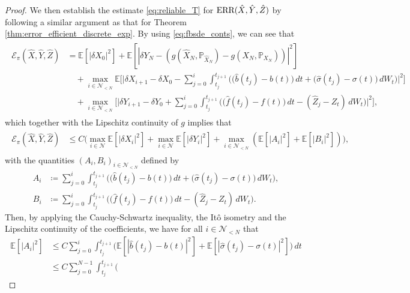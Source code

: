 \documentclass[11pt]{article}
\numberwithin{equation}{section}
\theoremstyle{definition}
\theoremstyle{remark}
\def\l{\label}  \def\f{\frac}  \def\fa{\forall}
\def\cE{\mathcal{E}}
\def\cN{\mathcal{N}}
\def\sE{{\mathbb{E}}}
\def\sP{\mathbb{P}}
\newcommand{\err}{\textnormal{ERR}}
\begin{document}
\begin{proof}
We then establish the estimate \eqref{eq:reliable_T} for $\err(\hat{X},\hat{Y},\hat{Z})$
by following a similar argument as that for Theorem \ref{thm:error_efficient_discrete_exp}.
By using \eqref{eq:fbsde_conts},
we can see that
\begin{align*}%
\begin{split}
\cE_\pi(\hat{X},\hat{Y},\hat{Z})
&=
\sE[|\delta {X}_0|^2]
+
\sE[|\delta {Y}_N-(g(\hat{X}_N,\sP_{\hat{X}_N})-g({X}_N,\sP_{{X}_N}))|^2]
\\
&\quad +
\max_{i\in \cN_{<N}}
\sE
\bigg[
\bigg|
\delta {X}_{i+1}
-\delta {X}_{0}
-\sum_{j=0}^i
\int_{t_j}^{t_{j+1}}
\bigg(
 \big(
\hat{b}(t_{j})-b(t)
 \big)\,dt  +
 \big(
 \hat{\sigma}(t_{j})-\sigma(t)
  \big)\,dW_t
  \bigg)
\bigg|^2
\bigg]\\
&\quad +
\max_{i\in \cN_{<N}}
\bigg[
\bigg|
\delta {Y}_{i+1}-\delta {Y}_0
+\sum_{j=0}^{i}
\int_{t_j}^{t_{j+1}}
\bigg(
\big(
 \hat{f}(t_{j})
 -{f}(t)
 \big)\,dt- 
 (\hat{Z}_j-Z_t)\,dW_t
 \bigg)
\bigg|^2
\bigg],
\end{split}
\end{align*}
which together with the Lipschitz continuity of $g$ implies that
\begin{align}%
\begin{split}
\cE_\pi(\hat{X},\hat{Y},\hat{Z})
&\le
C\bigg(
\max_{i\in \cN}\sE[|\delta {X}_i|^2]
+\max_{i\in \cN}\sE[|\delta {Y}_i|^2]
 +
\max_{i\in \cN_{<N}}
(\sE[ |A_{i}|^2] +\sE[ |B_{i}|^2])
\bigg),
\end{split}
\end{align}
with the quantities $(A_i,B_i)_{i\in \cN_{<N}}$  defined by
\begin{align*}
A_i
&\coloneqq 
\sum_{j=0}^i
\int_{t_j}^{t_{j+1}}
\bigg(
 \big(
\hat{b}(t_{j})-b(t)
 \big)\,dt  +
 \big(
 \hat{\sigma}(t_{j})-\sigma(t)
  \big)\,dW_t
  \bigg),
\\
B_i
&\coloneqq 
\sum_{j=0}^{i}
\int_{t_j}^{t_{j+1}}
\bigg(
\big(
 \hat{f}(t_{j})
 -{f}(t)
 \big)\,dt- 
 (\hat{Z}_j-Z_t)\,dW_t
 \bigg).
\end{align*}
Then, by applying the Cauchy-Schwartz inequality, the It\^{o} isometry
and the Lipschitz continuity of the coefficients, we have for all $i\in \cN_{<N}$ that
\begin{align*}
\sE[|A_i|^2]
&\le
C
\sum_{j=0}^i
\int_{t_j}^{t_{j+1}}
\bigg(
 \sE[
|\hat{b}(t_{j})-b(t)|^2]+\sE[|\hat{\sigma}(t_{j})-\sigma(t)|^2]
  \bigg)\,dt 
  \\
 &\le
C
\sum_{j=0}^{N-1}
\int_{t_j}^{t_{j+1}}
\bigg(

\end{align*}
\end{proof}
\end{document}
